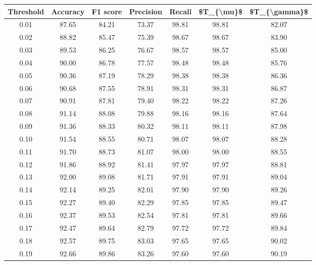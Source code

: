 \begin{tabular}{|c|c|c|c|c|c|c|}
\hline
 Threshold &  Accuracy &  F1 score &  Precision &  Recall &  \$T\_\{\textbackslash mu\}\$ &  \$T\_\{\textbackslash gamma\}\$ \\
\hline
      0.01 &     87.65 &     84.21 &      73.37 &   98.81 &      98.81 &         82.07 \\
      0.02 &     88.82 &     85.47 &      75.39 &   98.67 &      98.67 &         83.90 \\
      0.03 &     89.53 &     86.25 &      76.67 &   98.57 &      98.57 &         85.00 \\
      0.04 &     90.00 &     86.78 &      77.57 &   98.48 &      98.48 &         85.76 \\
      0.05 &     90.36 &     87.19 &      78.29 &   98.38 &      98.38 &         86.36 \\
      0.06 &     90.68 &     87.55 &      78.91 &   98.31 &      98.31 &         86.87 \\
      0.07 &     90.91 &     87.81 &      79.40 &   98.22 &      98.22 &         87.26 \\
      0.08 &     91.14 &     88.08 &      79.88 &   98.16 &      98.16 &         87.64 \\
      0.09 &     91.36 &     88.33 &      80.32 &   98.11 &      98.11 &         87.98 \\
      0.10 &     91.54 &     88.55 &      80.71 &   98.07 &      98.07 &         88.28 \\
      0.11 &     91.70 &     88.73 &      81.07 &   98.00 &      98.00 &         88.55 \\
      0.12 &     91.86 &     88.92 &      81.41 &   97.97 &      97.97 &         88.81 \\
      0.13 &     92.00 &     89.08 &      81.71 &   97.91 &      97.91 &         89.04 \\
      0.14 &     92.14 &     89.25 &      82.01 &   97.90 &      97.90 &         89.26 \\
      0.15 &     92.27 &     89.40 &      82.29 &   97.85 &      97.85 &         89.47 \\
      0.16 &     92.37 &     89.53 &      82.54 &   97.81 &      97.81 &         89.66 \\
      0.17 &     92.47 &     89.64 &      82.79 &   97.72 &      97.72 &         89.84 \\
      0.18 &     92.57 &     89.75 &      83.03 &   97.65 &      97.65 &         90.02 \\
      0.19 &     92.66 &     89.86 &      83.26 &   97.60 &      97.60 &         90.19 \\

\end{tabular}
